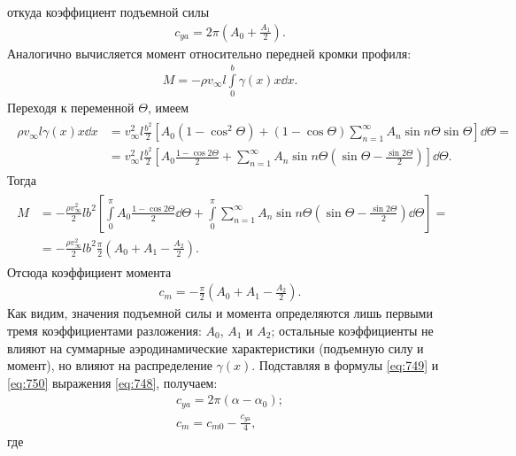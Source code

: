 	откуда коэффициент подъемной силы
	\begin{gather}\label{eq:749}
		c_{ya}=2\pi\left(A_0+\frac{A_1}{2}\right).
	\end{gather}\n
	Аналогично вычисляется момент относительно передней кромки профиля:
	\begin{gather*}
		M=-\rho v_\infty l\int\limits_0^b\gamma\left(x\right)x\dd x.
	\end{gather*}\n
	Переходя к переменной $\varTheta$, имеем
	\begin{gather*}
		\begin{aligned}
			\rho v_\infty l\gamma\left(x\right)x\dd x &= v_\infty^2 l\frac{b^2}{2}\left[A_0\left(1-\cos^2\varTheta\right)+\left(1-\cos\varTheta\right)\sum_{n=1}^{\infty}A_n\sin n\varTheta\sin\varTheta\right]\dd\varTheta =\\
			&= v_\infty^2 l\frac{b^2}{2}\left[A_0\frac{1-\cos 2\varTheta}{2}+\sum_{n=1}^{\infty}A_n\sin n\varTheta\left(\sin\varTheta-\frac{\sin 2\varTheta}{2}\right)\right]\dd\varTheta.
		\end{aligned}
	\end{gather*}\n
	Тогда
	\begin{gather*}
		\begin{aligned}
			M&=-\frac{\rho v_\infty^2}{2}lb^2\left[\int\limits_0^\pi A_0\frac{1-\cos 2\varTheta}{2}\dd\varTheta+\int\limits_0^\pi\sum_{n=1}^{\infty}A_n\sin n\varTheta\left(\sin\varTheta-\frac{\sin 2\varTheta}{2}\right)\dd\varTheta\right] =\\
			&=-\frac{\rho v_\infty^2}{2}lb^2\frac{\pi}{2}\left(A_0+A_1-\frac{A_2}{2}\right).
		\end{aligned}
	\end{gather*}\n
	Отсюда коэффициент момента
	\begin{gather}\label{eq:750}
		c_m=-\frac{\pi}{2}\left(A_0+A_1-\frac{A_2}{2}\right).
	\end{gather}\n
	Как видим, значения подъемной силы и момента определяются лишь первыми тремя коэффициентами разложения: $A_0$, $A_1$ и $A_2$; остальные коэффициенты не влияют на суммарные аэродинамические характеристики (подъемную силу и момент), но влияют на распределение $\gamma\left(x\right)$.\n
	Подставляя в формулы \eqref{eq:749} и \eqref{eq:750} выражения \eqref{eq:748}, получаем:
	\begin{gather}
		c_{ya}=2\pi\left(\alpha-\alpha_0\right);\label{eq:751}\\
		c_m=c_{m0}-\frac{c_{y\mathrm{a}}}{4},\label{eq:752}
	\end{gather}
	где
